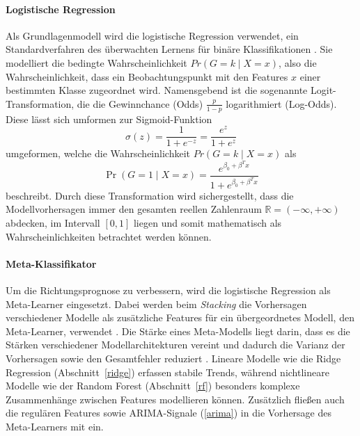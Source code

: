 \paragraph{Logistische Regression} \label{logistical_regression}
Als Grundlagenmodell wird die logistische Regression verwendet, ein Standardverfahren des überwachten Lernens für binäre Klassifikationen \cite{ismail_paper}. Sie modelliert die bedingte Wahrscheinlichkeit $Pr(G = k \mid X = x)$, also die Wahrscheinlichkeit, dass ein Beobachtungspunkt mit den Features $x$ einer bestimmten Klasse zugeordnet wird. Namensgebend ist die sogenannte Logit-Transformation, die die Gewinnchance (Odds) $\frac{p}{1-p}$ logarithmiert (Log-Odds). \cite[S.~102]{tesl} Diese lässt sich umformen zur Sigmoid-Funktion 
\begin{equation}
    \sigma(z) = \frac{1}{1 + e^{-z}} = \frac{e^z}{1 + e^z}
\end{equation}
umgeformen, welche die Wahrscheinlichkeit $Pr(G = k \mid X = x)$ als
\begin{equation}
    \Pr(G=1 \mid X=x) = \frac{e^{\beta_0 + \beta^T x}}{1 + e^{\beta_0 + \beta^T x}}
\end{equation}
beschreibt. \cite[S.~102]{tesl} Durch diese Transformation wird sichergestellt, dass die Modellvorhersagen immer den gesamten reellen Zahlenraum $\mathbb{R} = (-\infty,+\infty)$ abdecken, im Intervall $[0,1]$ liegen und somit mathematisch als Wahrscheinlichkeiten betrachtet werden können. \cite[S.~119f.]{tesl}

\paragraph{Meta-Klassifikator}
Um die Richtungsprognose zu verbessern, wird die logistische Regression als Meta-Learner eingesetzt. Dabei werden beim \textit{Stacking} die Vorhersagen verschiedener Modelle 
als zusätzliche Features für ein übergeordnetes Modell, den Meta-Learner, verwendet \cite[S.~290]{tesl}. Die Stärke eines Meta-Modells liegt darin, dass es die Stärken verschiedener Modellarchitekturen vereint und dadurch die Varianz der Vorhersagen sowie den Gesamtfehler reduziert \cite{ismail_paper}. Lineare Modelle wie die Ridge Regression (Abschnitt~\ref{ridge}) erfassen stabile Trends, während nichtlineare Modelle wie der Random Forest (Abschnitt~\ref{rf}) besonders komplexe Zusammenhänge zwischen Features modellieren können. Zusätzlich fließen auch die regulären Features sowie ARIMA-Signale (\ref{arima}) in die Vorhersage des Meta-Learners mit ein.

